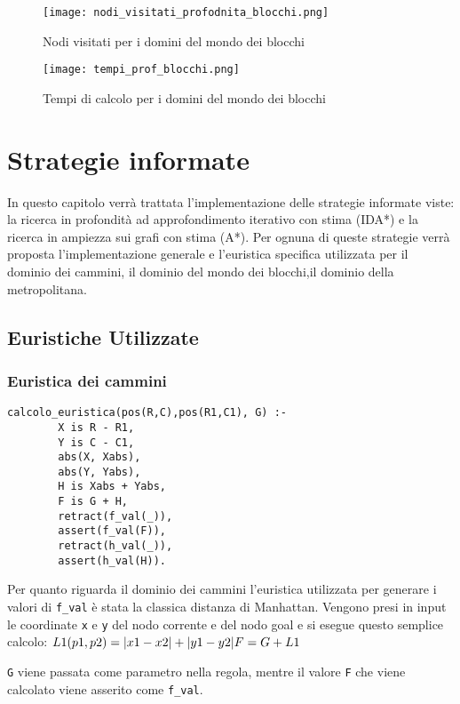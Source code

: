 \begin{figure}[h!tp]
  \texttt{[image: nodi\_visitati\_profodnita\_blocchi.png]}
  \caption{Nodi visitati per i domini del mondo dei blocchi}
  \label{fig:figure7}
\end{figure}

\begin{figure}[h!tp]
  \texttt{[image: tempi\_prof\_blocchi.png]}
  \caption{Tempi di calcolo per i domini del mondo dei blocchi}
  \label{fig:figure8}
\end{figure}

\chapter{Strategie informate}
In questo capitolo verrà trattata l'implementazione delle strategie informate viste: la ricerca in profondità ad approfondimento iterativo con stima (IDA*) e la ricerca in ampiezza sui grafi con stima (A*). Per ognuna di queste strategie verrà proposta l'implementazione generale e l'euristica specifica utilizzata per il dominio dei cammini, il dominio del mondo dei blocchi,il dominio della metropolitana.

\section{Euristiche Utilizzate}
\label{sec:Euristica dei cammini}
\subsection{Euristica dei cammini}
\begin{lstlisting}
calcolo_euristica(pos(R,C),pos(R1,C1), G) :-
        X is R - R1,
        Y is C - C1,
        abs(X, Xabs),
        abs(Y, Yabs),
        H is Xabs + Yabs,
        F is G + H,
        retract(f_val(_)),
        assert(f_val(F)),
        retract(h_val(_)),
        assert(h_val(H)).
\end{lstlisting}

Per quanto riguarda il dominio dei cammini l'euristica utilizzata per generare i valori di \lstinline{f_val} è stata la classica distanza di Manhattan. Vengono presi in input le coordinate \lstinline{x} e \lstinline{y} del nodo corrente e del nodo goal e si esegue questo semplice calcolo:
\begin{math}
$$ L1(p1,p2) = |x1 - x2| + |y1 - y2|$$
$$F = G + L1$$
\end{math}

\lstinline{G} viene passata come parametro nella regola, mentre il valore \lstinline{F} che viene calcolato viene asserito come \lstinline{f_val}.

